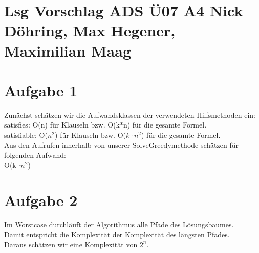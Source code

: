 \documentclass{article}
\begin{document}
	\section*{Lsg Vorschlag ADS Ü07 A4 Nick Döhring, Max Hegener, Maximilian Maag}
	 \section*{Aufgabe 1}
	 Zunächst schätzen wir die Aufwandsklassen der verwendeten Hilfsmethoden ein: \\
	 satisfies: O(n) für Klauseln bzw. O(k*n) für die gesamte Formel. \\
	 satisfiable: O($n^2$) für Klauseln bzw. O($k \cdot n^2$) für die gesamte Formel. \\
	 Aus den Aufrufen innerhalb von unserer SolveGreedymethode schätzen für folgenden Aufwand: \\
	 O(k $\cdot n^2$)
	 
	 \section*{Aufgabe 2}
	Im Worstcase durchläuft der Algorithmus alle Pfade des Lösungsbaumes. \\
	Damit entspricht die Komplexität der Komplexität des längsten Pfades. \\
	Daraus schätzen wir eine Komplexität von $2^n$.
	
	
\end{document}
